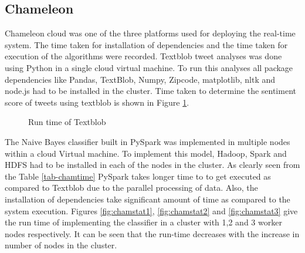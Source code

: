 \documentclass[9pt,twocolumn,twoside]{../../styles/osajnl}
\begin{document}
\subsection{Chameleon}
Chameleon cloud was one of the three platforms used for deploying the real-time system. The time taken for installation of dependencies and the time taken for execution of the algorithms were recorded. Textblob tweet analyses was done using Python in a single cloud virtual machine. To run this analyses all package dependencies like Pandas, TextBlob, Numpy, Zipcode, matplotlib, nltk and node.js had to be installed in the cluster. Time taken to determine the sentiment score of tweets using textblob is shown in Figure \ref{fig:tbrun}.\\
\begin{figure}[htbp]
\centering
{}
\caption{Run time of Textblob}
\label{fig:tbrun}
\end{figure}
The Naive Bayes classifier built in PySpark was implemented in multiple nodes within a cloud Virtual machine. To implement this model, Hadoop, Spark and HDFS had to be installed in each of the nodes in the cluster. As clearly seen from the Table \ref{tab-chamtime} PySpark takes longer time to to get executed as compared to Textblob due to the parallel processing of data. Also, the installation of dependencies take significant amount of time as compared to the system execution. Figures \ref{fig:chamstat1}, \ref{fig:chamstat2} and \ref{fig:chamstat3} give the run time of implementing the classifier in a cluster with 1,2 and 3 worker nodes respectively. It can be seen that the run-time decreases with the increase in number of nodes in the cluster. 
\end{document}
